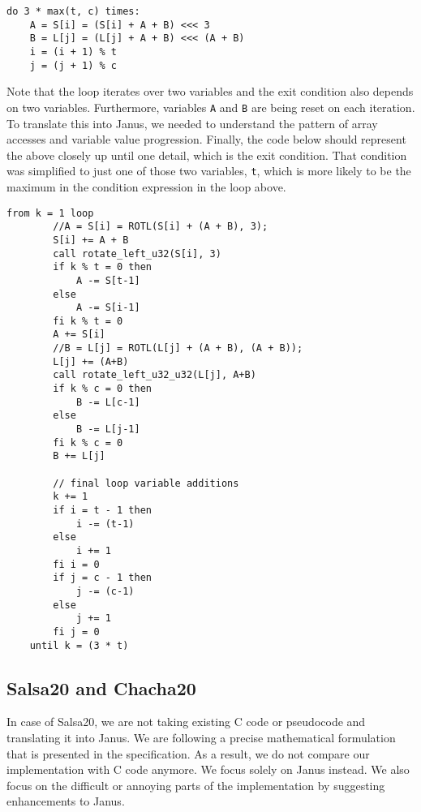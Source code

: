 \documentclass[a4paper,10pt,openright]{memoir}
\newcommand{\code}[1]{\texttt{#1}}
\begin{document}
\begin{verbatim}
do 3 * max(t, c) times:
    A = S[i] = (S[i] + A + B) <<< 3
    B = L[j] = (L[j] + A + B) <<< (A + B)
    i = (i + 1) % t
    j = (j + 1) % c
\end{verbatim}

Note that the loop iterates over two variables and the exit condition 
also depends on two variables. Furthermore, variables \code{A} and 
\code{B} are being reset on each iteration. To translate this into 
Janus, we needed to understand the pattern of array accesses and 
variable value progression. Finally, the code below should represent 
the above closely up until one detail, which is the exit condition. 
That condition was simplified to just one of those two variables, 
\code{t}, which is more likely to be the maximum in the condition 
expression in the loop above.

\begin{lstlisting}[language=Janus,breaklines=true]
	from k = 1 loop
        //A = S[i] = ROTL(S[i] + (A + B), 3);
        S[i] += A + B
        call rotate_left_u32(S[i], 3)
        if k % t = 0 then
            A -= S[t-1]
        else 
            A -= S[i-1]
        fi k % t = 0
        A += S[i]
        //B = L[j] = ROTL(L[j] + (A + B), (A + B));
        L[j] += (A+B)
        call rotate_left_u32_u32(L[j], A+B)
        if k % c = 0 then
            B -= L[c-1]
        else 
            B -= L[j-1]
        fi k % c = 0
        B += L[j]
        
        // final loop variable additions
        k += 1
        if i = t - 1 then
            i -= (t-1)
        else
            i += 1
        fi i = 0
        if j = c - 1 then
            j -= (c-1)
        else
            j += 1
        fi j = 0
    until k = (3 * t)
\end{lstlisting}

\subsection{Salsa20 and Chacha20}
\label{sec:impl:salsa}

In case of Salsa20, we are not taking existing C code or pseudocode and 
translating it into Janus. We are following a precise mathematical 
formulation that is presented in the specification\cite{salsa}. As a 
result, we do not compare our implementation with C code anymore. We 
focus solely on Janus instead. We also focus on the difficult or 
annoying parts of the implementation by suggesting enhancements to 
Janus.
\end{document}
